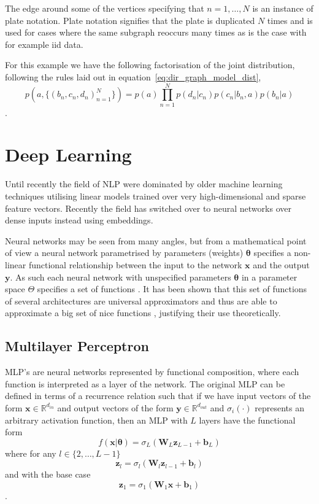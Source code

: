 The edge around some of the vertices specifying that $n = 1, \dots, N$ is an
instance of plate notation. Plate notation signifies that the plate is
duplicated $N$ times and is used for cases where the same subgraph reoccurs many
times as is the case with for example iid data.

For this example we have the following factorisation of the joint distribution,
following the rules laid out in equation~\eqref{eq:dir_graph_model_dist},
\begin{equation*}
  p(a, \{(b_n, c_n, d_n)_{n=1}^N\}) = p(a)\prod_{n=1}^Np(d_n | c_n)p(c_n | b_n, a)p(b_n | a)
\end{equation*}.

\section{Deep Learning}
Until recently the field of NLP were dominated by older machine learning
techniques utilising linear models trained over very high-dimensional and sparse
feature vectors. Recently the field has switched over to neural networks over
dense inputs instead using embeddings\cite[p.~1 - 2]{goldberg2015primer}.

Neural networks may be seen from many angles, but from a mathematical point of
view a neural network parametrised by parameters (weights) $\bm{\theta}$
specifies a non-linear functional relationship between the input to the network $\bm{x}$
and the output $\bm{y}$. As such each neural network with unspecified parameters
$\bm{\theta}$ in a parameter space $\Theta$ specifies a set of functions
\cite{Bishop:2006}. It has been shown that this set of functions of several
architectures are universal approximators and thus are able to approximate a big
set of nice functions \cite{Hornik:1989:MFN:70405.70408, Cybenko1989univapprox},
justifying their use theoretically.

\subsection{Multilayer Perceptron}
MLP's are neural networks represented by functional composition, where each
function is interpreted as a layer of the network. The original MLP can be defined in
terms of a recurrence relation such that if we have input vectors of the form $\bm{x} \in
\mathbb{R}^{d_{in}}$ and output vectors of the form $\bm{y} \in
\mathbb{R}^{d_{out}}$ and $\sigma_i( \cdot )$ represents an arbitrary activation
function, then an MLP with $L$ layers have the functional form
\begin{equation}
  f(\bm{x} | \bm{\theta}) = \sigma_L(\bm{W}_L \bm{z}_{L-1} + \bm{b}_{L})
\end{equation}
where for any $l \in \{2, \dots, L-1\}$
\begin{equation}
    \bm{z}_l = \sigma_l(\bm{W}_l \bm{z}_{l-1} + \bm{b}_l)
\end{equation}
and with the base case
\begin{equation}
  \bm{z}_1 = \sigma_1(\bm{W}_1 \bm{x} + \bm{b}_1)
\end{equation}\cite{BarberAppliedML}.

